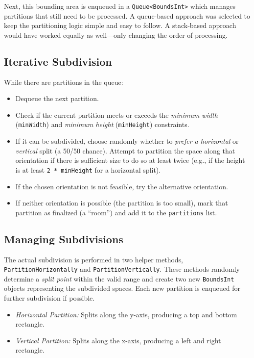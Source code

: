 \documentclass[a4paper, 12pt, one column, aas_macros]{article}
\begin{document}
Next, this bounding area is enqueued in a \texttt{Queue<BoundsInt>} which manages partitions that still need to be processed. A queue-based approach was selected to keep the partitioning logic simple and easy to follow. A stack-based approach would have worked equally as well---only changing the order of processing.

\subsection{Iterative Subdivision}
While there are partitions in the queue:
\begin{itemize}
  \item Dequeue the next partition.
  \item Check if the current partition meets or exceeds the \emph{minimum width} (\texttt{minWidth}) and \emph{minimum height} (\texttt{minHeight}) constraints.
  \item If it can be subdivided, choose randomly whether to \emph{prefer a horizontal} or \emph{vertical} split (a 50/50 chance). Attempt to partition the space along that orientation if there is sufficient size to do so at least twice (e.g., if the height is at least \texttt{2 * minHeight} for a horizontal split).
  \item If the chosen orientation is not feasible, try the alternative orientation.
  \item If neither orientation is possible (the partition is too small), mark that partition as finalized (a ``room'') and add it to the \texttt{partitions} list.
\end{itemize}

\subsection{Managing Subdivisions}
The actual subdivision is performed in two helper methods, \texttt{PartitionHorizontally} and \texttt{PartitionVertically}. These methods randomly determine a \emph{split point} within the valid range and create two new \texttt{BoundsInt} objects representing the subdivided spaces. Each new partition is enqueued for further subdivision if possible.

\begin{itemize}
  \item \emph{Horizontal Partition:} Splits along the y-axis, producing a top and bottom rectangle.
  \item \emph{Vertical Partition:} Splits along the x-axis, producing a left and right rectangle.
\end{itemize}
\end{document}
